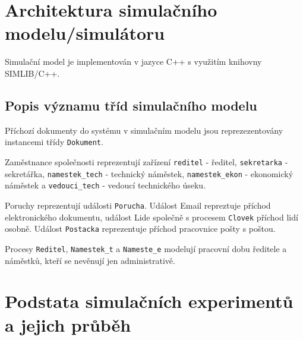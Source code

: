 \documentclass[12pt,a4paper]{article}
\begin{document}


\newpage


\section{Architektura simulačního modelu/simulátoru}

Simulační model je implementován v jazyce C++ s využitím knihovny SIMLIB/C++.


\subsection{Popis významu tříd simulačního modelu}

Příchozí dokumenty do systému v simulačním modelu jsou reprezezentovány instancemi třídy {\tt Dokument}.

Zaměstnance společnosti reprezentují zařízení {\tt reditel} - ředitel, {\tt sekretarka} - sekretářka, {\tt namestek\_tech} - technický náměstek,
{\tt namestek\_ekon} - ekonomický náměstek a {\tt vedouci\_tech} - vedoucí technického úseku.

Poruchy reprezentují události {\tt Porucha}.
Událost Email repreztuje příchod elektronického dokumentu, událost Lide společně s procesem {\tt Clovek} příchod lidí osobně.
Událost {\tt Postacka} reprezentuje příchod pracovnice pošty s poštou.

Procesy {\tt Reditel}, {\tt Namestek\_t} a {\tt Nameste\_e} modelují pracovní dobu ředitele a náměstků, kteří se nevěnují jen administrativě.


\newpage


\section{Podstata simulačních experimentů a jejich průběh}
\end{document}
